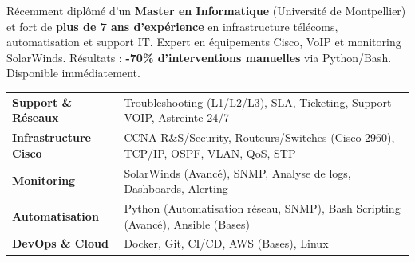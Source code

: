\documentclass[11pt,a4paper]{article}
\begin{document}
\cvheader{\textcolor{black}{\LARGE Ingénieur Support IT \& Réseaux}}

Récemment diplômé d'un \textbf{Master en Informatique} (Université de Montpellier) et fort de \textbf{plus de 7 ans d'expérience} en infrastructure télécoms, automatisation et support IT. Expert en équipements Cisco, VoIP et monitoring SolarWinds. Résultats : \textbf{-70\% d'interventions manuelles} via Python/Bash. Disponible immédiatement.

\noindent
\begin{tabularx}{\linewidth}{@{} p{3.5cm} X @{}}
\textbf{Support \& Réseaux} & Troubleshooting (L1/L2/L3), SLA, Ticketing, Support VOIP, Astreinte 24/7 \\
\textbf{Infrastructure Cisco} & CCNA R\&S/Security, Routeurs/Switches (Cisco 2960), TCP/IP, OSPF, VLAN, QoS, STP \\
\textbf{Monitoring} & SolarWinds (Avancé), SNMP, Analyse de logs, Dashboards, Alerting \\
\textbf{Automatisation} & Python (Automatisation réseau, SNMP), Bash Scripting (Avancé), Ansible (Bases) \\
\textbf{DevOps \& Cloud} & Docker, Git, CI/CD, AWS (Bases), Linux \\
\end{tabularx}
\end{document}
